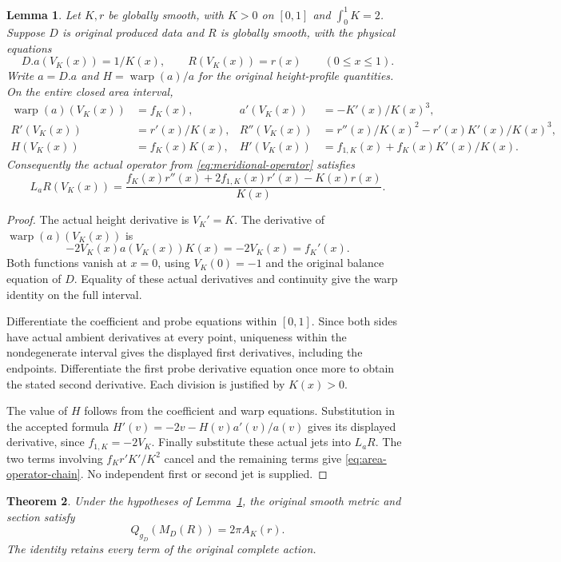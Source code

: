\documentclass[11pt]{article}
\newtheorem{theorem}{Theorem}[section]
\newtheorem{lemma}[theorem]{Lemma}
\begin{document}
\begin{lemma}\label{lem:actual-area-probe-jets}
Let $K,r$ be globally smooth, with $K>0$ on $[0,1]$ and $\int_0^1K=2$.
Suppose $D$ is original produced data and $R$ is globally smooth, with the
physical equations
\[
 D.a(V_K(x))=1/K(x),\qquad R(V_K(x))=r(x)\qquad(0\leq x\leq1).
\]
Write $a=D.a$ and $H=\operatorname{warp}(a)/a$ for the original height-profile
quantities. On the entire closed area interval,
\begin{align*}
 \operatorname{warp}(a)(V_K(x))&=f_K(x),&
 a'(V_K(x))&=-K'(x)/K(x)^3,\\
 R'(V_K(x))&=r'(x)/K(x),&
 R''(V_K(x))&=r''(x)/K(x)^2-r'(x)K'(x)/K(x)^3,\\
 H(V_K(x))&=f_K(x)K(x),&
 H'(V_K(x))&=f_{1,K}(x)+f_K(x)K'(x)/K(x).
\end{align*}
Consequently the actual operator from \eqref{eq:meridional-operator} satisfies
\begin{equation}\label{eq:area-operator-chain}
 L_aR(V_K(x))
   =\frac{f_K(x)r''(x)+2f_{1,K}(x)r'(x)-K(x)r(x)}{K(x)} .
\end{equation}
\end{lemma}

\begin{proof}
The actual height derivative is $V_K'=K$.
The derivative of $\operatorname{warp}(a)(V_K(x))$ is
\[
 -2V_K(x)a(V_K(x))K(x)=-2V_K(x)=f_K'(x).
\]
Both functions vanish at $x=0$, using $V_K(0)=-1$ and the original
balance equation of $D$. Equality of these actual derivatives and continuity
give the warp identity on the full interval.

Differentiate the coefficient and probe equations within $[0,1]$.
Since both sides have actual ambient derivatives at every point, uniqueness
within the nondegenerate interval gives the displayed first derivatives,
including the endpoints. Differentiate the first probe derivative equation
once more to obtain the stated second derivative. Each division is justified
by $K(x)>0$.

The value of $H$ follows from the coefficient and warp equations.
Substitution in the accepted formula
$H'(v)=-2v-H(v)a'(v)/a(v)$ gives its displayed derivative, since
$f_{1,K}=-2V_K$. Finally substitute these actual jets into $L_aR$.
The two terms involving $f_Kr'K'/K^2$ cancel and the remaining terms give
\eqref{eq:area-operator-chain}. No independent first or second jet is supplied.
\end{proof}

\begin{theorem}\label{thm:complete-area-action-bridge}
Under the hypotheses of Lemma~\ref{lem:actual-area-probe-jets}, the original
smooth metric and section satisfy
\[
 Q_{g_D}(M_D(R))=2\pi A_K(r).
\]
The identity retains every term of the original complete action.
\end{theorem}
\end{document}
